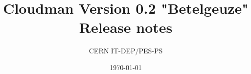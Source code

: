 \documentclass[12pt]{article}
\begin{document}
\thispagestyle{empty}
\title{Cloudman Version 0.2 "Betelgeuze" Release notes}
\author{CERN IT-DEP/PES-PS}
\date{\today}
\maketitle 
\end{document}
